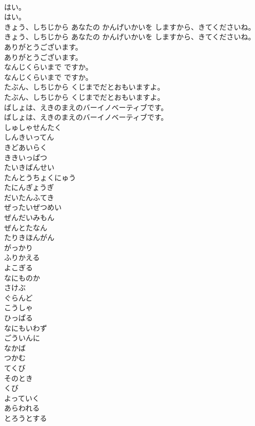 \documentclass[8pt]{extreport}
\begin{document}
\begin{CJK}{UTF8}{min}
\\	はい。	
\\	はい。 
\\	きょう、しちじから あなたの かんげいかいを しますから、きてくださいね。	
\\	きょう、しちじから あなたの かんげいかいを しますから、きてくださいね。 
\\	ありがとうございます。	
\\	ありがとうございます。 
\\	なんじくらいまで ですか。	
\\	なんじくらいまで ですか。 
\\	たぶん、しちじから くじまでだとおもいますよ。	
\\	たぶん、しちじから くじまでだとおもいますよ。 
\\	ばしょは、えきのまえのバーイノベーティブです。	
\\	ばしょは、えきのまえのバーイノベーティブです。 
\\	しゅしゃせんたく
\\	しんきいってん
\\	きどあいらく
\\	ききいっぱつ
\\	たいきばんせい
\\	たんとうちょくにゅう
\\	たにんぎょうぎ
\\	だいたんふてき
\\	ぜったいぜつめい
\\	ぜんだいみもん
\\	ぜんとたなん
\\	たりきほんがん
\\	がっかり
\\	ふりかえる
\\	よこぎる
\\	なにものか
\\	さけぶ
\\	ぐらんど
\\	こうしゃ
\\	ひっぱる
\\	なにもいわず
\\	ごういんに
\\	なかば
\\	つかむ
\\	てくび
\\	そのとき
\\	くび
\\	よっていく
\\	あらわれる
\\	とろうとする

\end{CJK}
\end{document}
